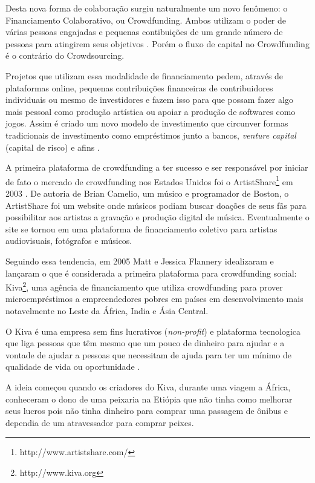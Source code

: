 Desta nova forma de colaboração surgiu naturalmente um novo fenômeno: o Financiamento Colaborativo, ou Crowdfunding. Ambos utilizam o poder de várias pessoas engajadas e pequenas contibuições de um grande número de pessoas para atingirem seus objetivos \cite{crowdfunding-culture}. Porém o fluxo de capital no Crowdfunding é o contrário do Crowdsourcing.

Projetos que utilizam essa modalidade de financiamento pedem, através de plataformas online, pequenas contribuições financeiras de contribuidores individuais ou mesmo de investidores e fazem isso para que possam fazer algo mais pessoal como produção artística ou apoiar a produção de softwares como jogos. Assim é criado um novo modelo de investimento que circunver formas tradicionais de investimento como empréstimos junto a bancos, \emph{venture capital} (capital de risco) e afins \cite{belleflamme2010}.

A primeira plataforma de crowdfunding a ter sucesso e ser responsável por iniciar de fato o mercado de crowdfunding nos Estados Unidos foi o ArtistShare\footnote{http://www.artistshare.com/} em 2003 \cite{freedman2015brief}. De autoria de Brian Camelio, um músico e programador de Boston, o ArtistShare foi um website onde músicos podiam buscar doações de seus fãs para possibilitar aos artistas a gravação e produção digital de música. Eventualmente o site se tornou em uma plataforma de financiamento coletivo para artistas audiovisuais, fotógrafos e músicos.

Seguindo essa tendencia, em 2005 Matt e Jessica Flannery idealizaram e lançaram o que é considerada a primeira plataforma para crowdfunding social: Kiva\footnote{http://www.kiva.org}, uma agência de financiamento que utiliza crowdfunding para prover microempréstimos a empreendedores pobres em países em desenvolvimento mais notavelmente no Leste da África, India e Ásia Central.

O Kiva é uma empresa sem fins lucrativos (\emph{non-profit}) e plataforma tecnologica que liga pessoas que têm mesmo que um pouco de dinheiro para ajudar e a vontade de ajudar a pessoas que necessitam de ajuda para ter um mínimo de qualidade de vida ou oportunidade \cite{flannery2007kiva}.

A ideia começou quando os criadores do Kiva, durante uma viagem a África, conheceram o dono de uma peixaria na Etiópia que não tinha como melhorar seus lucros pois não tinha dinheiro para comprar uma passagem de ônibus e dependia de um atravessador para comprar peixes.

